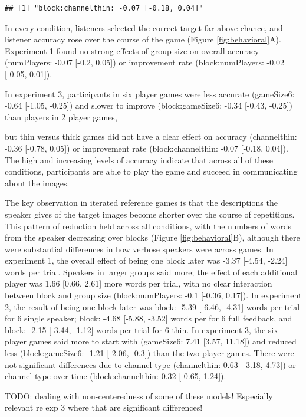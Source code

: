\documentclass[
  english,
  a4paper,
]{article}
\begin{document}
\begin{verbatim}
## [1] "block:channelthin: -0.07 [-0.18, 0.04]"
\end{verbatim}

In every condition, listeners selected the correct target far above chance, and listener accuracy rose over the course of the game (Figure \ref{fig:behavioral}A). Experiment 1 found no strong effects of group size on overall accuracy (numPlayers: -0.07 {[}-0.2, 0.05{]}) or improvement rate (block:numPlayers: -0.02 {[}-0.05, 0.01{]}).

In experiment 3, participants in six player games were less accurate (gameSize6: -0.64 {[}-1.05, -0.25{]}) and slower to improve (block:gameSize6: -0.34 {[}-0.43, -0.25{]}) than players in 2 player games,

but thin versus thick games did not have a clear effect on accuracy (channelthin: -0.36 {[}-0.78, 0.05{]}) or improvement rate (block:channelthin: -0.07 {[}-0.18, 0.04{]}). The high and increasing levels of accuracy indicate that across all of these conditions, participants are able to play the game and succeed in communicating about the images.

The key observation in iterated reference games is that the descriptions the speaker gives of the target images become shorter over the course of repetitions. This pattern of reduction held across all conditions, with the numbers of words from the speaker decreasing over blocks (Figure \ref{fig:behavioral}B), although there were substantial differences in how verbose speakers were across games. In experiment 1, the overall effect of being one block later was -3.37 {[}-4.54, -2.24{]} words per trial. Speakers in larger groups said more; the effect of each additional player was 1.66 {[}0.66, 2.61{]} more words per trial, with no clear interaction between block and group size (block:numPlayers: -0.1 {[}-0.36, 0.17{]}). In experiment 2, the result of being one block later was block: -5.39 {[}-6.46, -4.31{]} words per trial for 6 single speaker; block: -4.68 {[}-5.88, -3.52{]} words per for 6 full feedback, and block: -2.15 {[}-3.44, -1.12{]} words per trial for 6 thin. In experiment 3, the six player games said more to start with (gameSize6: 7.41 {[}3.57, 11.18{]}) and reduced less (block:gameSize6: -1.21 {[}-2.06, -0.3{]}) than the two-player games. There were not significant differences due to channel type (channelthin: 0.63 {[}-3.18, 4.73{]}) or channel type over time (block:channelthin: 0.32 {[}-0.65, 1.24{]}).

TODO: dealing with non-centeredness of some of these models! Especially relevant re exp 3 where that are significant differences!
\end{document}
